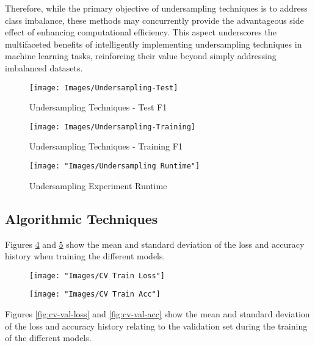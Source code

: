 \documentclass[journal]{IEEEtran}
\begin{document}
	Therefore, while the primary objective of undersampling techniques is to address class imbalance, these methods may concurrently provide the advantageous side effect of enhancing computational efficiency. This aspect underscores the multifaceted benefits of intelligently implementing undersampling techniques in machine learning tasks, reinforcing their value beyond simply addressing imbalanced datasets.	

\begin{figure}
	\centering
	\texttt{[image: Images/Undersampling-Test]}
	\caption{Undersampling Techniques - Test F1}
	\label{fig:undersampling-test}
\end{figure}
	
\begin{figure}
	\centering
	\texttt{[image: Images/Undersampling-Training]}
	\caption{Undersampling Techniques - Training F1}
	\label{fig:undersampling-training}
\end{figure}

\begin{figure}
	\centering
	\texttt{[image: "Images/Undersampling Runtime"]}
	\caption{Undersampling Experiment Runtime}
	\label{fig:undersampling-runtime}
\end{figure}
	
	\subsection{Algorithmic Techniques}
	
	Figures \ref{fig:cv-train-loss} and \ref{fig:cv-train-acc} show the mean and standard deviation of the loss and accuracy history when training the different models.
	
	\begin{figure}
		\centering
		\texttt{[image: "Images/CV Train Loss"]}
		\caption{}
		\label{fig:cv-train-loss}
	\end{figure}
	
\begin{figure}
	\centering
	\texttt{[image: "Images/CV Train Acc"]}
	\caption{}
	\label{fig:cv-train-acc}
\end{figure}
	
	Figures \ref{fig:cv-val-loss} and \ref{fig:cv-val-acc} show the mean and standard deviation of the loss and accuracy history relating to the validation
	set during the training of the different models.
\end{document}
